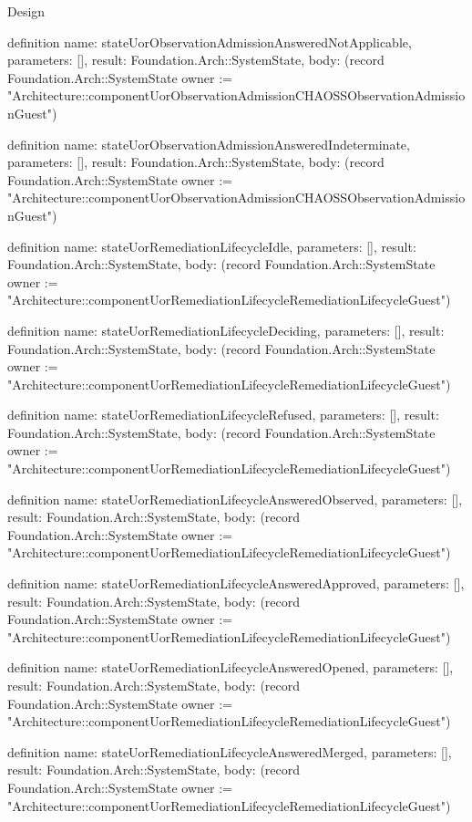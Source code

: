 \begin{lexlean}{Design}
\begin{semanticmodule}
definition{
  name: stateUorObservationAdmissionAnsweredNotApplicable,
  parameters: [],
  result: Foundation.Arch::SystemState,
  body: (record Foundation.Arch::SystemState {owner := "Architecture::componentUorObservationAdmissionCHAOSSObservationAdmissionGuest"})
}

definition{
  name: stateUorObservationAdmissionAnsweredIndeterminate,
  parameters: [],
  result: Foundation.Arch::SystemState,
  body: (record Foundation.Arch::SystemState {owner := "Architecture::componentUorObservationAdmissionCHAOSSObservationAdmissionGuest"})
}

definition{
  name: stateUorRemediationLifecycleIdle,
  parameters: [],
  result: Foundation.Arch::SystemState,
  body: (record Foundation.Arch::SystemState {owner := "Architecture::componentUorRemediationLifecycleRemediationLifecycleGuest"})
}

definition{
  name: stateUorRemediationLifecycleDeciding,
  parameters: [],
  result: Foundation.Arch::SystemState,
  body: (record Foundation.Arch::SystemState {owner := "Architecture::componentUorRemediationLifecycleRemediationLifecycleGuest"})
}

definition{
  name: stateUorRemediationLifecycleRefused,
  parameters: [],
  result: Foundation.Arch::SystemState,
  body: (record Foundation.Arch::SystemState {owner := "Architecture::componentUorRemediationLifecycleRemediationLifecycleGuest"})
}

definition{
  name: stateUorRemediationLifecycleAnsweredObserved,
  parameters: [],
  result: Foundation.Arch::SystemState,
  body: (record Foundation.Arch::SystemState {owner := "Architecture::componentUorRemediationLifecycleRemediationLifecycleGuest"})
}

definition{
  name: stateUorRemediationLifecycleAnsweredApproved,
  parameters: [],
  result: Foundation.Arch::SystemState,
  body: (record Foundation.Arch::SystemState {owner := "Architecture::componentUorRemediationLifecycleRemediationLifecycleGuest"})
}

definition{
  name: stateUorRemediationLifecycleAnsweredOpened,
  parameters: [],
  result: Foundation.Arch::SystemState,
  body: (record Foundation.Arch::SystemState {owner := "Architecture::componentUorRemediationLifecycleRemediationLifecycleGuest"})
}

definition{
  name: stateUorRemediationLifecycleAnsweredMerged,
  parameters: [],
  result: Foundation.Arch::SystemState,
  body: (record Foundation.Arch::SystemState {owner := "Architecture::componentUorRemediationLifecycleRemediationLifecycleGuest"})
}


\end{semanticmodule}
\end{lexlean}
